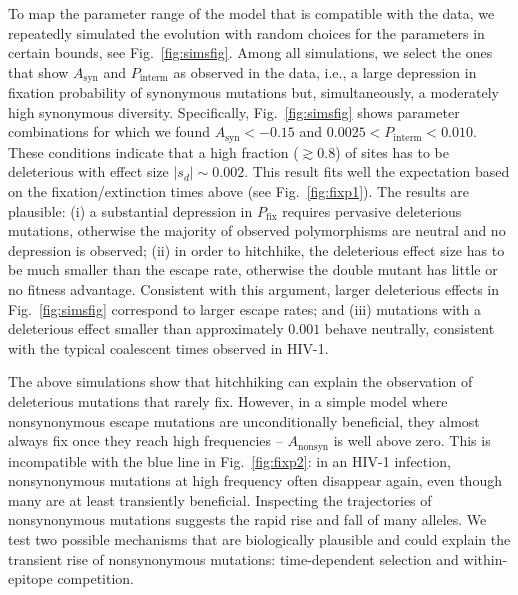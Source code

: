 \documentclass[rmp, twocolumn]{revtex4}
\newcommand{\pfix}{P_{\mathrm{fix}}}
\newcommand{\FIG}[1]{Fig.~\ref{fig:#1}}
\begin{document}
To map the parameter range of the model that is compatible with the data, we
repeatedly simulated the evolution with random choices for the parameters in
certain bounds, see \FIG{simsfig}. Among all simulations, we select the ones
that show $A_\text{syn}$ and $P_\text{interm}$ as observed in the data, i.e., a
large depression in fixation probability of synonymous mutations but,
simultaneously, a moderately high synonymous diversity. Specifically,
\FIG{simsfig} shows parameter combinations for which we found $A_\text{syn} <
-0.15$ and $0.0025 < P_\text{interm} < 0.010$. These conditions indicate that a
high fraction ($\gtrsim 0.8$) of sites has to be deleterious with effect size
$|s_d| \sim 0.002$.  This result fits well the expectation based on the
fixation/extinction times above (see \FIG{fixp1}). The results are plausible:
(i) a substantial depression in $\pfix$ requires pervasive deleterious
mutations, otherwise the majority of observed polymorphisms are neutral and no
depression is observed; (ii) in order to hitchhike, the deleterious effect size
has to be much smaller than the escape rate, otherwise the double mutant has
little or no fitness advantage. Consistent with this argument, larger
deleterious effects in \FIG{simsfig} correspond to larger escape rates; and (iii)
mutations with a deleterious effect smaller than approximately $0.001$ behave
neutrally, consistent with the typical coalescent times observed in HIV-1.

The above simulations show that hitchhiking can explain the observation of
deleterious mutations that rarely fix. However, in a simple model where
nonsynonymous escape mutations are unconditionally beneficial, they almost
always fix once they reach high frequencies -- $A_{\mathrm{nonsyn}}$ is well
above zero. This is incompatible with the blue line in \FIG{fixp2}: in an HIV-1
infection, nonsynonymous mutations at high frequency often disappear again, even
though many are at least transiently beneficial. Inspecting the trajectories of
nonsynonymous mutations suggests the rapid rise and fall of many alleles. We
test two possible mechanisms that are biologically plausible and could explain
the transient rise of nonsynonymous mutations: time-dependent selection and
within-epitope competition.
\end{document}
